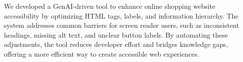 We developed a GenAI-driven tool to enhance online shopping website accessibility by optimizing HTML tags, labels, and information hierarchy. The system addresses common barriers for screen reader users, such as inconsistent headings, missing alt text, and unclear button labels. By automating these adjustments, the tool reduces developer effort and bridges knowledge gaps, offering a more efficient way to create accessible web experiences.


